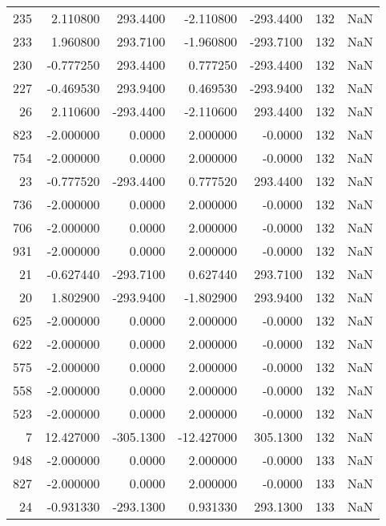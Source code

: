 \begin{tabular}{rrrrrrr}
 235 &    2.110800 &  293.4400 &   -2.110800 &   -293.4400 &         132 & NaN \\
 233 &    1.960800 &  293.7100 &   -1.960800 &   -293.7100 &         132 & NaN \\
 230 &   -0.777250 &  293.4400 &    0.777250 &   -293.4400 &         132 & NaN \\
 227 &   -0.469530 &  293.9400 &    0.469530 &   -293.9400 &         132 & NaN \\
  26 &    2.110600 & -293.4400 &   -2.110600 &    293.4400 &         132 & NaN \\
 823 &   -2.000000 &    0.0000 &    2.000000 &     -0.0000 &         132 & NaN \\
 754 &   -2.000000 &    0.0000 &    2.000000 &     -0.0000 &         132 & NaN \\
  23 &   -0.777520 & -293.4400 &    0.777520 &    293.4400 &         132 & NaN \\
 736 &   -2.000000 &    0.0000 &    2.000000 &     -0.0000 &         132 & NaN \\
 706 &   -2.000000 &    0.0000 &    2.000000 &     -0.0000 &         132 & NaN \\
 931 &   -2.000000 &    0.0000 &    2.000000 &     -0.0000 &         132 & NaN \\
  21 &   -0.627440 & -293.7100 &    0.627440 &    293.7100 &         132 & NaN \\
  20 &    1.802900 & -293.9400 &   -1.802900 &    293.9400 &         132 & NaN \\
 625 &   -2.000000 &    0.0000 &    2.000000 &     -0.0000 &         132 & NaN \\
 622 &   -2.000000 &    0.0000 &    2.000000 &     -0.0000 &         132 & NaN \\
 575 &   -2.000000 &    0.0000 &    2.000000 &     -0.0000 &         132 & NaN \\
 558 &   -2.000000 &    0.0000 &    2.000000 &     -0.0000 &         132 & NaN \\
 523 &   -2.000000 &    0.0000 &    2.000000 &     -0.0000 &         132 & NaN \\
   7 &   12.427000 & -305.1300 &  -12.427000 &    305.1300 &         132 & NaN \\
 948 &   -2.000000 &    0.0000 &    2.000000 &     -0.0000 &         133 & NaN \\
 827 &   -2.000000 &    0.0000 &    2.000000 &     -0.0000 &         133 & NaN \\
  24 &   -0.931330 & -293.1300 &    0.931330 &    293.1300 &         133 & NaN \\

\end{tabular}

